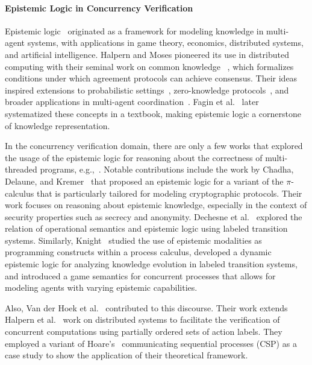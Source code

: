 \paragraph{Epistemic Logic in Concurrency Verification}
Epistemic logic~\cite{hintikka1962knowledge} originated as a framework for modeling knowledge in multi-agent systems, with applications in game theory, economics, distributed systems, and artificial intelligence. Halpern and Moses pioneered its use in distributed computing with their seminal work on common knowledge ~\cite{DBLP:conf/podc/HalpernM84,DBLP:journals/jacm/HalpernM90}, which formalizes conditions under which agreement protocols can achieve consensus. Their ideas inspired extensions to probabilistic settings~\cite{DBLP:conf/podc/HalpernT89}, zero-knowledge protocols~\cite{DBLP:conf/stoc/HalpernMT88}, and broader applications in multi-agent coordination~\cite{DBLP:conf/podc/NeigerT87,DBLP:conf/wdag/NeigerT90,DBLP:conf/podc/PanangadenT88}. Fagin et al.~\cite{DBLP:books/mit/FHMV1995} later systematized these concepts in a textbook, making epistemic logic a cornerstone of knowledge representation.

In the concurrency verification domain, there are only a few works that explored the usage of the epistemic logic for reasoning about the correctness of multi-threaded programs, e.g.,~\cite{DBLP:phd/hal/Knight13,DBLP:conf/forte/ChadhaDK09,DBLP:conf/lpar/DechesneMO07}. Notable contributions include the work by Chadha, Delaune, and Kremer~\cite{DBLP:conf/forte/ChadhaDK09} that proposed an epistemic logic for a variant of the $\pi$-calculus that is particularly tailored for modeling cryptographic protocols. Their work focuses on reasoning about epistemic knowledge, especially in the context of security properties such as secrecy and anonymity. Dechesne et al.~\cite{DBLP:conf/lpar/DechesneMO07} explored the relation of operational semantics and epistemic logic using labeled transition systems. Similarly, Knight~\cite{knight2013epistemic} studied the use of epistemic modalities as programming constructs within a process calculus, developed a dynamic epistemic logic for analyzing knowledge evolution in labeled transition systems, and introduced a game semantics for concurrent processes that allows for modeling agents with varying epistemic capabilities.

Also, Van der Hoek et al.~\cite{DBLP:conf/rex/HoekHM92} contributed to this discourse. Their work extends Halpern et al.~\cite{DBLP:conf/ijcai/HalpernM85,DBLP:journals/jacm/HalpernM90} work on distributed systems to facilitate the verification of concurrent computations using partially ordered sets of action labels. They employed a variant of Hoare's~\cite{DBLP:journals/cacm/Hoare78} communicating sequential processes (CSP) as a case study to show the application of their theoretical framework. 

